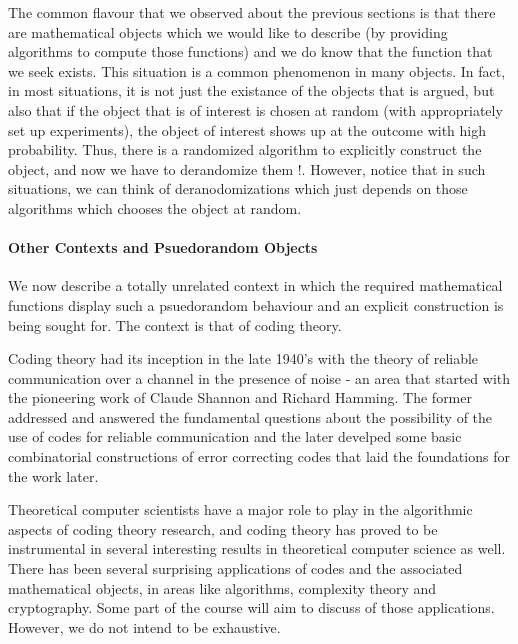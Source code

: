 \begin{remark}
The common flavour that we observed about the previous sections is that there are mathematical objects which we would like to describe (by providing algorithms to compute those functions) and we do know that the function that we seek exists. This situation is a common phenomenon in many objects. In fact, in most situations, it is not just the existance of the objects that is argued, but also that if the object that is of interest is chosen at random (with appropriately set up experiments), the object of interest shows up at the outcome with high probability. Thus, there is a randomized algorithm to explicitly construct the object, and now we have to derandomize them !. However, notice that in such situations, we can think of deranodomizations which just depends on those algorithms which chooses the object at random.
\end{remark}

\paragraph{Other Contexts and Psuedorandom Objects}

We now describe a totally unrelated context in which the required mathematical functions display such a psuedorandom behaviour and an explicit construction is being sought for. The context is that of coding theory.

Coding theory had its inception in the late 1940's with the theory of
reliable communication over a channel in the presence of noise - an
area that started with the pioneering work of Claude Shannon and
Richard Hamming. The former addressed and  answered the fundamental
questions about the possibility of the use of codes for reliable
communication and the later develped some basic combinatorial
constructions of error correcting codes that laid the foundations for
the work later.

Theoretical computer scientists have a major role to play in the algorithmic
aspects of coding theory research, and coding theory has proved to be instrumental in 
several interesting results in theoretical computer science as well. There has been several surprising
applications of codes and the associated mathematical objects, in
areas like algorithms, complexity theory and cryptography.  
Some part of the course will aim to discuss of those applications. 
However, we do not intend to be exhaustive. 


